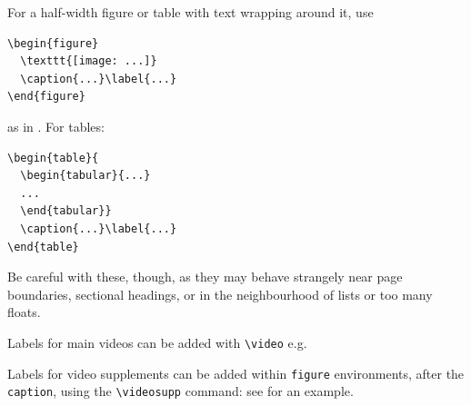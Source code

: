 \documentclass[9pt,lineno]{elife}
\begin{document}
For a half-width figure or table with text wrapping around it, use 

\begin{verbatim}
\begin{figure}
  \texttt{[image: ...]}
  \caption{...}\label{...}
\end{figure}
\end{verbatim}
%
as in . For tables:

\begin{verbatim}
\begin{table}{
  \begin{tabular}{...}
  ...
  \end{tabular}}
  \caption{...}\label{...}
\end{table}
\end{verbatim}

Be careful with these, though, as they may behave strangely near page boundaries, sectional headings, or in the neighbourhood of lists or too many floats.

Labels for main videos can be added with \verb|\video| e.g.



Labels for video supplements can be added within \texttt{figure} environments, after the \texttt{caption}, using the \verb|\videosupp| command: see  for an example.
\end{document}
